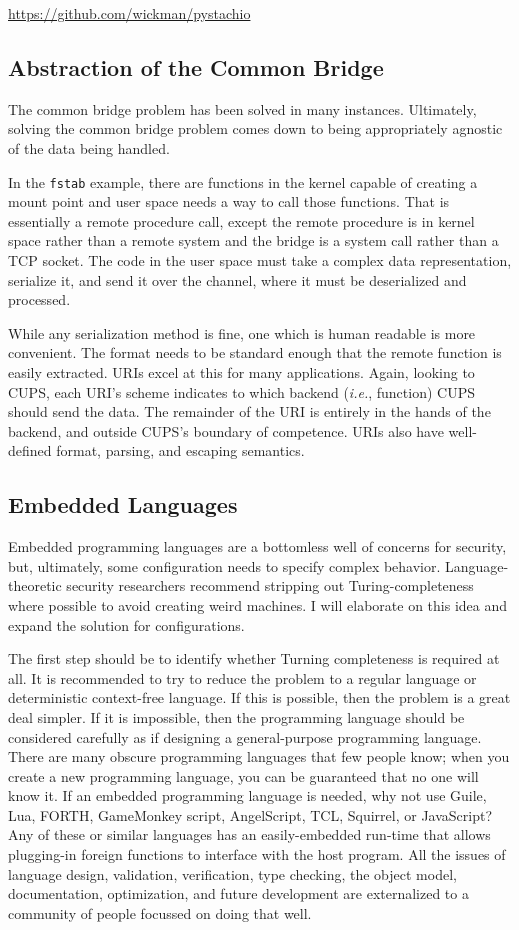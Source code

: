 \documentclass[letterpaper,twocolumn,10pt]{article}
\begin{document}
\noindent \url{https://github.com/wickman/pystachio}

\subsection{Abstraction of the Common Bridge}
The common bridge problem has been solved in many instances. Ultimately, solving the common bridge problem comes down to being appropriately agnostic of the data being handled.

In the \texttt{fstab} example, there are functions in the kernel capable of creating a mount point and user space needs a way to call those functions. That is essentially a remote procedure call, except the remote procedure is in kernel space rather than a remote system and the bridge is a system call rather than a TCP socket. The code in the user space must take a complex data representation, serialize it, and send it over the channel, where it must be deserialized and processed.

While any serialization method is fine, one which is human readable is more convenient. The format needs to be standard enough that the remote function is easily extracted. URIs excel at this for many applications. Again, looking to CUPS, each URI's scheme indicates to which backend (\emph{i.e.}, function) CUPS should send the data. The remainder of the URI is entirely in the hands of the backend, and outside CUPS's boundary of competence. URIs also have well-defined format, parsing, and escaping semantics.

\subsection{Embedded Languages}
Embedded programming languages are a bottomless well of concerns for security, but, ultimately, some configuration needs to specify complex behavior. Language-theoretic security researchers recommend stripping out Turing-completeness where possible to avoid creating weird machines. I will elaborate on this idea and expand the solution for configurations.

The first step should be to identify whether Turning completeness is required at all. It is recommended to try to reduce the problem to a regular language or deterministic context-free language. If this is possible, then the problem is a great deal simpler. If it is impossible, then the programming language should be considered carefully as if designing a general-purpose programming language. There are many obscure programming languages that few people know; when you create a new programming language, you can be guaranteed that no one will know it.\cite{kws} If an embedded programming language is needed, why not use Guile, Lua, FORTH, GameMonkey script, AngelScript, TCL, Squirrel, or JavaScript? Any of these or similar languages has an easily-embedded run-time that allows plugging-in foreign functions to interface with the host program. All the issues of language design, validation, verification, type checking, the object model, documentation, optimization, and future development are externalized to a community of people focussed on doing that well.
\end{document}
